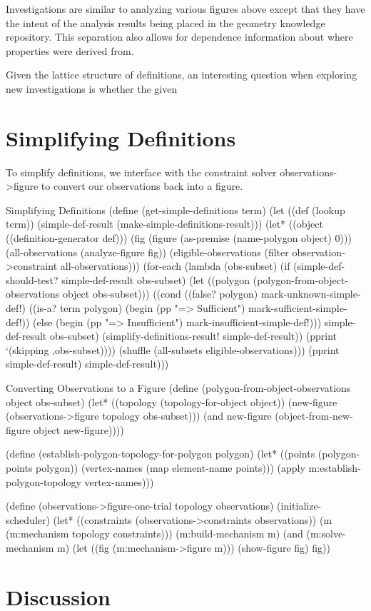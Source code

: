 Investigations are similar to analyzing various figures above except
that they have the intent of the analysis results being placed in the
geometry knowledge repository. This separation also allows for
dependence information about where properties were derived from.

Given the lattice structure of definitions, an interesting question when exploring
new investigations is whether the given

\section{Simplifying Definitions}

To simplify definitions, we interface with the constraint solver
observations->figure to convert our observations back into a figure.

\begin{code-listing}{Simplifying Definitions}
(define (get-simple-definitions term)
  (let ((def (lookup term))
        (simple-def-result (make-simple-definitions-result)))
    (let* ((object ((definition-generator def)))
           (fig (figure (as-premise (name-polygon object) 0)))
           (all-observations (analyze-figure fig))
           (eligible-observations
            (filter observation->constraint all-observations)))
      (for-each
       (lambda (obs-subset)
         (if (simple-def-should-test? simple-def-result obs-subset)
             (let ((polygon
                    (polygon-from-object-observations object obs-subset)))
               ((cond ((false? polygon) mark-unknown-simple-def!)
                      ((is-a? term polygon)
                       (begin (pp "=> Sufficient")
                              mark-sufficient-simple-def!))
                      (else (begin (pp "=> Insufficient")
                                   mark-insufficient-simple-def!)))
                simple-def-result obs-subset)
               (simplify-definitions-result! simple-def-result))
             (pprint `(skipping ,obs-subset))))
       (shuffle (all-subsets eligible-observations)))
      (pprint simple-def-result)
      simple-def-result)))
\end{code-listing}

\begin{code-listing}{Converting Observations to a Figure}
(define (polygon-from-object-observations object obs-subset)
  (let* ((topology (topology-for-object object))
         (new-figure (observations->figure topology obs-subset)))
    (and new-figure (object-from-new-figure object new-figure))))

(define (establish-polygon-topology-for-polygon polygon)
  (let* ((points (polygon-points polygon))
         (vertex-names (map element-name points)))
    (apply m:establish-polygon-topology vertex-names)))

(define (observations->figure-one-trial topology observations)
  (initialize-scheduler)
  (let* ((constraints (observations->constraints observations))
         (m (m:mechanism topology constraints)))
    (m:build-mechanism m)
    (and (m:solve-mechanism m)
         (let ((fig (m:mechanism->figure m)))
           (show-figure fig)
           fig))
\end{code-listing}

\section{Discussion}

